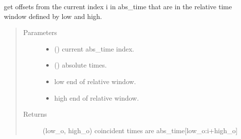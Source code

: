 \documentclass[letterpaper,10pt,english]{sphinxmanual}
\begin{document}
\begin{fulllineitems}
\label{\detokenize{tes:tes.analysis.window}}
\sphinxAtStartPar
get offsets from the current index i in abs\_time that are in the relative
time window defined by low and high.
\begin{quote}\begin{description}
\item[{Parameters}] \leavevmode\begin{itemize}
\item {} 
\sphinxAtStartPar
{} () \textendash{} current abs\_time index.

\item {} 
\sphinxAtStartPar
{} () \textendash{} absolute times.

\item {} 
\sphinxAtStartPar
{} \textendash{} low end of relative window.

\item {} 
\sphinxAtStartPar
{} \textendash{} high end of relative window.

\end{itemize}

\item[{Returns}] \leavevmode
\sphinxAtStartPar
(low\_o, high\_o) coincident times are abs\_time{[}low\_o:i+high\_o{]}

\end{description}\end{quote}

\end{fulllineitems}

\end{document}
